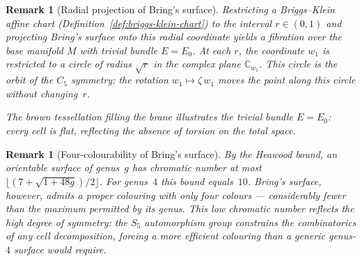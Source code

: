 \documentclass[12pt,a4paper]{report}
\newtheorem{remark}[theorem]{Remark}
\begin{document}
\begin{remark}[Radial projection of Bring's surface]
\label{rem:radial-projection}
Restricting a Briggs--Klein affine chart
(Definition~\ref{def:briggs-klein-chart}) to the interval $r\in(0,1)$ and
projecting Bring's surface onto this radial coordinate yields a fibration
over the base manifold $M$ with trivial bundle $E=E_0$.  At each
$r$, the coordinate $w_1$ is restricted to a circle of radius $\sqrt{r}$ in
the complex plane $\mathbb{C}_{w_1}$.  This circle is the orbit of the $C_5$
symmetry: the rotation $w_1\mapsto\zeta\,w_1$ moves the point along this
circle without changing~$r$.

\medskip
\begin{center}
\end{center}
\noindent
The brown tessellation filling the brane illustrates the trivial bundle
$E=E_0$: every cell is flat, reflecting the absence of torsion on the total
space.
\end{remark}

\begin{remark}[Four-colourability of Bring's surface]
\label{rem:four-colourability}
By the Heawood bound, an orientable surface of genus~$g$ has chromatic number
at most $\lfloor(7+\sqrt{1+48g})/2\rfloor$.  For genus~$4$ this bound
equals~$10$.  Bring's surface, however, admits a proper colouring with only
four colours --- considerably fewer than the maximum permitted by its genus.
This low chromatic number reflects the high degree of symmetry: the $S_5$
automorphism group constrains the combinatorics of any cell decomposition,
forcing a more efficient colouring than a generic genus-$4$ surface would
require.
\end{remark}
\end{document}

